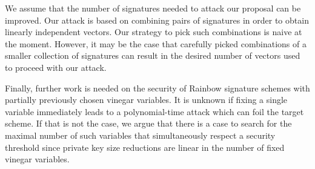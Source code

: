 \documentclass[12pt, a4paper, oneside]{memoir}
\theoremstyle{definition}
\begin{document}
We assume that the number of signatures needed to attack our proposal can be improved. Our attack is based on combining pairs of signatures in order to obtain linearly independent vectors. Our strategy to pick such combinations is naive at the moment. However, it may be the case that carefully picked combinations of a smaller collection of signatures can result in the desired number of vectors used to proceed with our attack.

Finally, further work is needed on the security of Rainbow signature schemes with partially previously chosen vinegar variables. It is unknown if fixing a single variable immediately leads to a polynomial-time attack which can foil the target scheme. If that is not the case, we argue that there is a case to search for the maximal number of such variables that simultaneously respect a security threshold since private key size reductions are linear in the number of fixed vinegar variables.



\end{document}
